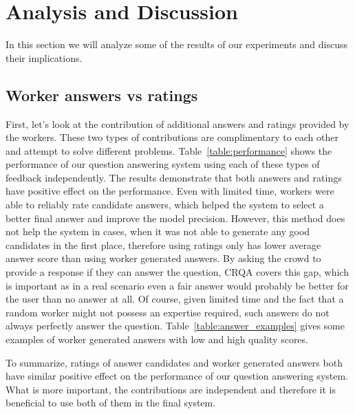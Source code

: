 \documentclass[letterpaper]{article}
\begin{document}
\section{Analysis and Discussion}
\label{sec:analysis}

In this section we will analyze some of the results of our experiments and discuss their implications.

\subsection{Worker answers vs ratings}
\label{sec:analysis:answers_vs_ratings}

First, let's look at the contribution of additional answers and ratings provided by the workers.
These two types of contributions are complimentary to each other and attempt to solve different problems.
Table~\ref{table:performance} shows the performance of our question answering system using each of these types of feedback independently.
The results demonstrate that both answers and ratings have positive effect on the performance.
Even with limited time, workers were able to reliably rate candidate answers, which helped the system to select a better final answer and improve the model precision.
However, this method does not help the system in cases, when it was not able to generate any good candidates in the first place, therefore using ratings only has lower average answer score than using worker generated answers.
By asking the crowd to provide a response if they can answer the question, CRQA covers this gap, which is important as in a real scenario even a fair answer would probably be better for the user than no answer at all.
Of course, given limited time and the fact that a random worker might not possess an expertise required, such answers do not always perfectly answer the question.
Table~\ref{table:answer_examples} gives some examples of worker generated answers with low and high quality scores.

To summarize, ratings of answer candidates and worker generated answers both have similar positive effect on the performance of our question answering system.
What is more important, the contributions are independent and therefore it is beneficial to use both of them in the final system.
\end{document}
